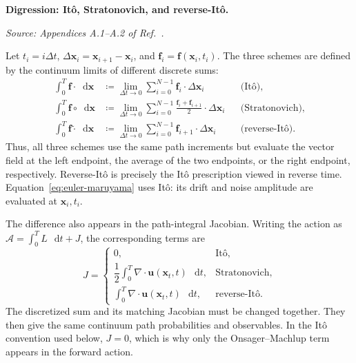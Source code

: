 \documentclass[11pt]{article}
\newcommand{\vct}[1]{\bm{#1}}
\newcommand{\dd}{\mathop{}\!\mathrm{d}}
\begin{document}
\begin{mdframed}[
    linewidth=0.6pt,
    innerleftmargin=6pt,
    innerrightmargin=6pt,
    innertopmargin=6pt,
    innerbottommargin=6pt
]
\textbf{Digression: It\^{o}, Stratonovich, and reverse-It\^{o}.}\par
\emph{Source: Appendices A.1--A.2 of Ref.~\cite{hirono2024}.}\par
Let \(t_i=i\Delta t\), \(\Delta\vct{x}_i=\vct{x}_{i+1}-\vct{x}_i\), and
\(\vct{f}_i=\vct{f}(\vct{x}_i,t_i)\). The three schemes are defined by
the continuum limits of different discrete sums:
\begin{align*}
    \int_0^T \vct{f}\cdot\dd\vct{x}
    &\coloneqq \lim_{\Delta t\to0}
      \sum_{i=0}^{N-1}\vct{f}_i\cdot\Delta\vct{x}_i
      &&\text{(It\^{o})},\\
    \int_0^T \vct{f}\circ\dd\vct{x}
    &\coloneqq \lim_{\Delta t\to0}
      \sum_{i=0}^{N-1}
      \frac{\vct{f}_i+\vct{f}_{i+1}}{2}\cdot\Delta\vct{x}_i
      &&\text{(Stratonovich)},\\
    \int_0^T \vct{f}\mathbin{\tilde{\cdot}}\dd\vct{x}
    &\coloneqq \lim_{\Delta t\to0}
      \sum_{i=0}^{N-1}\vct{f}_{i+1}\cdot\Delta\vct{x}_i
      &&\text{(reverse-It\^{o})}.
\end{align*}
Thus, all three schemes use the same path increments but evaluate the vector
field at the left endpoint, the average of the two endpoints, or the right
endpoint, respectively. Reverse-It\^{o} is precisely the It\^{o} prescription
viewed in reverse time. Equation~\eqref{eq:euler-maruyama} uses It\^{o}: its
drift and noise amplitude are evaluated at \(\vct{x}_i,t_i\).

The difference also appears in the path-integral Jacobian. Writing the action as
\(\mathcal{A}=\int_0^T L\,\dd t+J\), the corresponding terms are
\begin{equation*}
    J=\begin{cases}
        0, & \text{It\^{o}},\\
        \dfrac{1}{2}\displaystyle\int_0^T
        \nabla\cdot\vct{u}(\vct{x}_t,t)\,\dd t,
        & \text{Stratonovich},\\
        \displaystyle\int_0^T
        \nabla\cdot\vct{u}(\vct{x}_t,t)\,\dd t,
        & \text{reverse-It\^{o}}.
    \end{cases}
\end{equation*}
The discretized sum and its matching Jacobian must be changed together. They
then give the same continuum path probabilities and observables. In the It\^{o}
convention used below, \(J=0\), which is why only the Onsager--Machlup term
appears in the forward action.
\end{mdframed}
\end{document}
